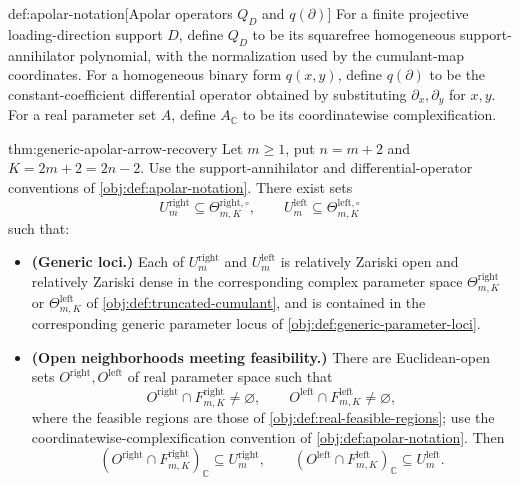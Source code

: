 \begin{definitionv}{def:apolar-notation}[Apolar operators \(Q_D\) and \(q(\partial)\)]
For a finite projective loading-direction support \(D\), define \(Q_D\) to be its squarefree homogeneous support-annihilator polynomial, with the normalization used by the cumulant-map coordinates. For a homogeneous binary form \(q(x,y)\), define \(q(\partial)\) to be the constant-coefficient differential operator obtained by substituting \(\partial_x,\partial_y\) for \(x,y\). For a real parameter set \(A\), define \(A_{\mathbb C}\) to be its coordinatewise complexification.
\end{definitionv}

\begin{theoremv}{thm:generic-apolar-arrow-recovery}
Let \(m\geq 1\), put \(n=m+2\) and \(K=2m+2=2n-2\). Use the support-annihilator and differential-operator conventions of \cref{obj:def:apolar-notation}.  There exist sets
\[
U_m^{\mathrm{right}}\subseteq \Theta^{\mathrm{right},\circ}_{m,K},
\qquad
U_m^{\mathrm{left}}\subseteq \Theta^{\mathrm{left},\circ}_{m,K}
\]
such that:

\begin{itemize}
\item \textbf{(Generic loci.)} Each of \(U_m^{\mathrm{right}}\) and \(U_m^{\mathrm{left}}\) is relatively Zariski open and relatively Zariski dense in the corresponding complex parameter space \(\Theta^{\mathrm{right}}_{m,K}\) or \(\Theta^{\mathrm{left}}_{m,K}\) of \cref{obj:def:truncated-cumulant}, and is contained in the corresponding generic parameter locus of \cref{obj:def:generic-parameter-loci}.

\item \textbf{(Open neighborhoods meeting feasibility.)} There are Euclidean-open sets \(O^{\mathrm{right}},O^{\mathrm{left}}\) of real parameter space such that
\[
O^{\mathrm{right}}\cap F^{\mathrm{right}}_{m,K}\neq\varnothing,
\qquad
O^{\mathrm{left}}\cap F^{\mathrm{left}}_{m,K}\neq\varnothing,
\]
where the feasible regions are those of \cref{obj:def:real-feasible-regions}; use the coordinatewise-complexification convention of \cref{obj:def:apolar-notation}. Then
\[
\left(O^{\mathrm{right}}\cap F^{\mathrm{right}}_{m,K}\right)_{\mathbb C}
 \subseteq U_m^{\mathrm{right}},
\qquad
\left(O^{\mathrm{left}}\cap F^{\mathrm{left}}_{m,K}\right)_{\mathbb C}
 \subseteq U_m^{\mathrm{left}}.
\]


\end{itemize}
\end{theoremv}
